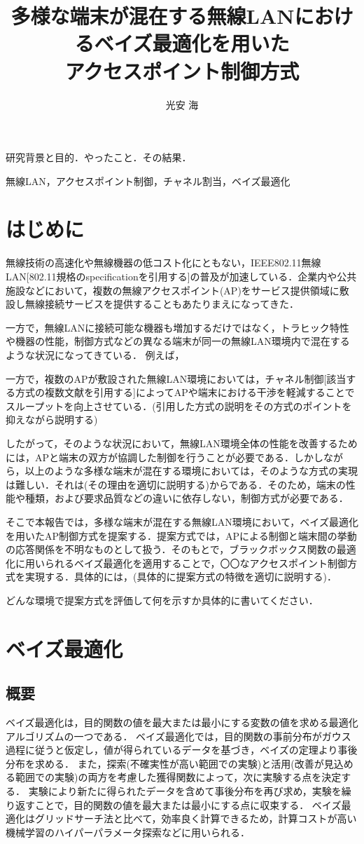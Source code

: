 \documentclass[a4paper,11pt]{jarticle}
\title{多様な端末が混在する無線LANにおけるベイズ最適化を用いた\\アクセスポイント制御方式}
\author{光安 海}
\begin{document}
\titlepage    %
\abstract     %
研究背景と目的．やったこと．その結果．

\keyword
無線LAN，アクセスポイント制御，チャネル割当，ベイズ最適化
\tableofcontents    %
%
%
\section{はじめに}
無線技術の高速化や無線機器の低コスト化にともない，IEEE802.11無線LAN[802.11規格のspecificationを引用する]の普及が加速している．企業内や公共施設などにおいて，複数の無線アクセスポイント(AP)をサービス提供領域に敷設し無線接続サービスを提供することもあたりまえになってきた．

一方で，無線LANに接続可能な機器も増加するだけではなく，トラヒック特性や機器の性能，制御方式などの異なる端末が同一の無線LAN環境内で混在するような状況になってきている．
例えば，

一方で，複数のAPが敷設された無線LAN環境においては，チャネル制御[該当する方式の複数文献を引用する]によってAPや端末における干渉を軽減することでスループットを向上させている．(引用した方式の説明をその方式のポイントを抑えながら説明する)

したがって，そのような状況において，無線LAN環境全体の性能を改善するためには，APと端末の双方が協調した制御を行うことが必要である．しかしながら，以上のような多様な端末が混在する環境においては，そのような方式の実現は難しい．それは(その理由を適切に説明する)からである．そのため，端末の性能や種類，および要求品質などの違いに依存しない，制御方式が必要である．

そこで本報告では，多様な端末が混在する無線LAN環境において，ベイズ最適化を用いたAP制御方式を提案する．提案方式では，APによる制御と端末間の挙動の応答関係を不明なものとして扱う．そのもとで，ブラックボックス関数の最適化に用いられるベイズ最適化を適用することで，〇〇なアクセスポイント制御方式を実現する．具体的には，(具体的に提案方式の特徴を適切に説明する)．

どんな環境で提案方式を評価して何を示すか具体的に書いてください．

\section{ベイズ最適化\cite{Brochu2010}}
\subsection{概要}
ベイズ最適化は，目的関数の値を最大または最小にする変数の値を求める最適化アルゴリズムの一つである．
ベイズ最適化では，目的関数の事前分布がガウス過程に従うと仮定し，値が得られているデータを基づき，ベイズの定理より事後分布を求める．
また，探索(不確実性が高い範囲での実験)と活用(改善が見込める範囲での実験)の両方を考慮した獲得関数によって，次に実験する点を決定する．
実験により新たに得られたデータを含めて事後分布を再び求め，実験を繰り返すことで，目的関数の値を最大または最小にする点に収束する．
ベイズ最適化はグリッドサーチ法と比べて，効率良く計算できるため，計算コストが高い機械学習のハイパーパラメータ探索などに用いられる．
\end{document}
